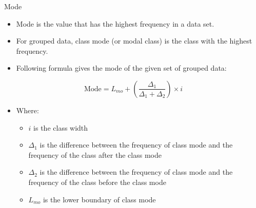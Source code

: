 \documentclass[
  ignorenonframetext,
  aspectratio=169]{beamer}
\providecommand{\tightlist}{%
  \setlength{\itemsep}{0pt}\setlength{\parskip}{0pt}}
\begin{document}
\begin{frame}{Mode}
\protect\hypertarget{mode}{}
\begin{itemize}
\tightlist
\item
  Mode is the value that has the highest frequency in a data set.
\item
  For grouped data, class mode (or modal class) is the class with the
  highest frequency.
\item
  Following formula gives the mode of the given set of grouped data:
\end{itemize}

\[
\text{Mode} = L_{mo} + \left( \frac{\Delta_1}{\Delta_1 + \Delta_2} \right)\times i
\]

\begin{itemize}
\tightlist
\item
  Where:

  \begin{itemize}
  \tightlist
  \item
    \(i\) is the class width
  \item
    \(\Delta_1\) is the difference between the frequency of class mode
    and the frequency of the class after the class mode
  \item
    \(\Delta_2\) is the difference between the frequency of class mode
    and the frequency of the class before the class mode
  \item
    \(L_{mo}\) is the lower boundary of class mode
  \end{itemize}
\end{itemize}
\end{frame}
\end{document}
